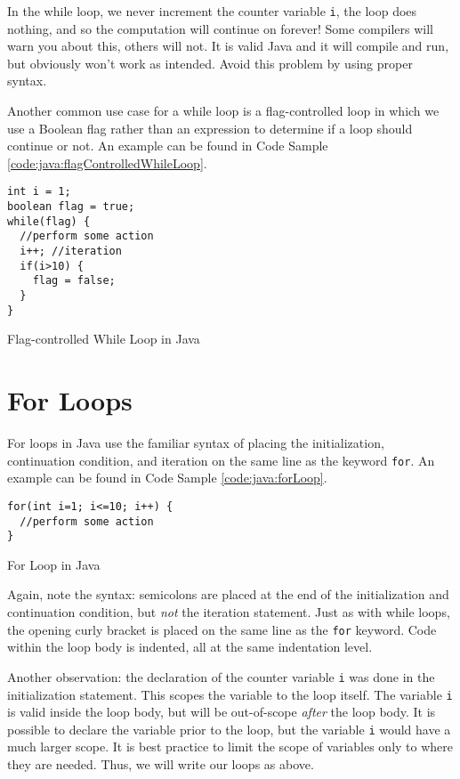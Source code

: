 In the while loop, we never increment the counter variable \texttt{i}, 
the loop does nothing, and so the computation will continue on
forever!  Some compilers will warn you about this, others will not.  It
is valid Java and it will compile and run, but obviously won't work as intended.
Avoid this problem by using proper syntax.

Another common use case for a while loop is a flag-controlled loop in which
we use a Boolean flag rather than an expression to determine if a loop
should continue or not.  An example
can be found in Code Sample \ref{code:java:flagControlledWhileLoop}.

\begin{listing}
\begin{verbatim}
int i = 1;
boolean flag = true;
while(flag) {
  //perform some action
  i++; //iteration  
  if(i>10) {
    flag = false;
  }
}
\end{verbatim}
  \caption{Flag-controlled While Loop in Java}
  \label{code:java:flagControlledWhileLoop}
\end{listing}

\section{For Loops}

For loops in Java use the familiar syntax of placing the initialization, continuation
condition, and iteration on the same line as the keyword \texttt{for}.
An example can be found in Code Sample \ref{code:java:forLoop}.

\begin{listing}[H]
\begin{verbatim}
for(int i=1; i<=10; i++) {
  //perform some action
}
\end{verbatim}
  \caption{For Loop in Java}
  \label{code:java:forLoop}
\end{listing}

Again, note the syntax: semicolons are placed at the end of the initialization and
continuation condition, but \emph{not} the iteration statement.  Just as with while
loops, the opening curly bracket is placed on the same line as the \texttt{for}
keyword.  Code within the loop body is indented, all at the same indentation level.

Another observation: the declaration of the counter variable \texttt{i} 
was done in the initialization statement.  This scopes the variable to the loop itself.
The variable \texttt{i} is valid inside the loop body, but will be out-of-scope
\emph{after} the loop body.  It is possible to declare the variable prior to the loop, but
the variable \texttt{i} would have a much larger scope.  It is best practice 
to limit the scope of variables only to where they are needed.  Thus, we will
write our loops as above.

